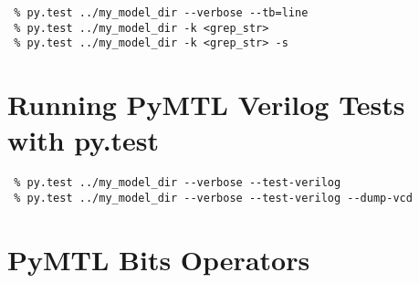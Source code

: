 \documentclass{cbxdoc}
\begin{document}
\begin{verbatim}
 % py.test ../my_model_dir --verbose --tb=line
 % py.test ../my_model_dir -k <grep_str>
 % py.test ../my_model_dir -k <grep_str> -s
\end{verbatim}


\section{Running PyMTL Verilog Tests with py.test}

\begin{verbatim}
 % py.test ../my_model_dir --verbose --test-verilog
 % py.test ../my_model_dir --verbose --test-verilog --dump-vcd
\end{verbatim}


\clearpage

\section{PyMTL Bits Operators}

\newenvironment{optbl}[3][0.32in]
{
  \vspace{0pt}\centering
  \BF{#2}\vphantom{g}
  \smallskip

  \begin{tabular}{>{\ttfamily\centering\arraybackslash}p{#1}p{#3}}
\toprule
}{
\bottomrule
  \end{tabular}
}
\end{document}
